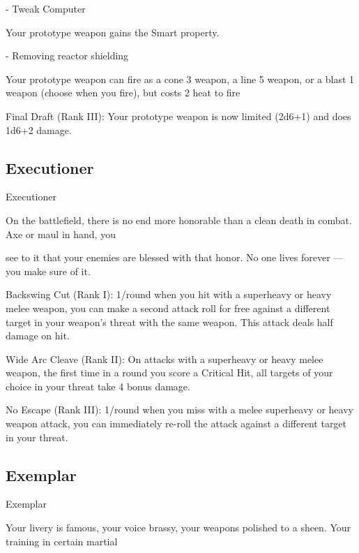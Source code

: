   - Tweak Computer
 

                                                                                                                 


         Your prototype weapon gains the Smart property. 
 
  - Removing reactor shielding
 
         Your prototype weapon can fire as a cone 3 weapon, a line 5 weapon, or a blast 1  
         weapon (choose when you fire), but costs 2 heat to fire
 
Final Draft (Rank III): Your prototype weapon is now limited (2d6+1) and does 1d6+2 damage.
 
\subsection{Executioner}

                                                Executioner  

On the battlefield, there is no end more honorable than a clean death in combat. Axe or maul in hand, you  

see to it that your enemies are blessed with that honor. No one lives forever — you make sure of it.   

Backswing Cut (Rank I): 1/round when you hit with a superheavy or heavy melee weapon, you  
can make a second attack roll for free against a different target in your weapon’s threat with the  
same weapon. This attack deals half damage on hit.
 
Wide Arc Cleave (Rank II): On attacks with a superheavy or heavy melee weapon, the first time  
in a round you score a Critical Hit, all targets of your choice in your threat take 4 bonus damage.
 
No Escape (Rank III): 1/round when you miss with a melee superheavy or heavy weapon attack,  
you can immediately re-roll the attack against a different target in your threat.
 
\subsection{Exemplar}

                                                  Exemplar  

Your livery is famous, your voice brassy, your weapons polished to a sheen. Your training in certain martial  

